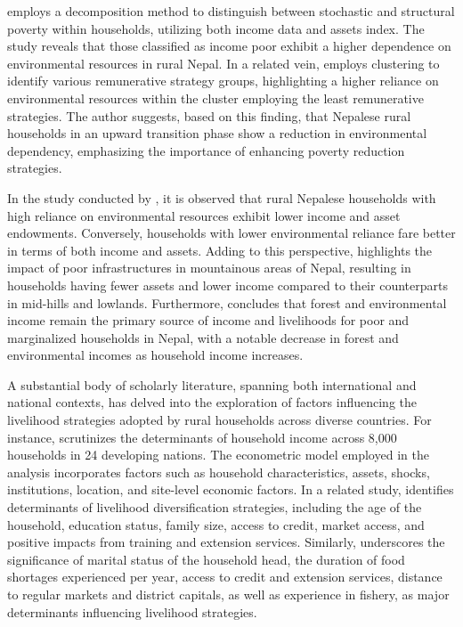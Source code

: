 \documentclass[12pt, a4paper]{article}
\begin{document}
\cite{charlery2015assessing} employs a decomposition method to distinguish between stochastic and structural poverty within households, utilizing both income data and assets index. The study reveals that those classified as income poor exhibit a higher dependence on environmental resources in rural Nepal. In a related vein, \cite{walelign2017dynamics} employs clustering to identify various remunerative strategy groups, highlighting a higher reliance on environmental resources within the cluster employing the least remunerative strategies. The author suggests, based on this finding, that Nepalese rural households in an upward transition phase show a reduction in environmental dependency, emphasizing the importance of enhancing poverty reduction strategies. 

In the study conducted by \cite{walelign2020environmental}, it is observed that rural Nepalese households with high reliance on environmental resources exhibit lower income and asset endowments. Conversely, households with lower environmental reliance fare better in terms of both income and assets. Adding to this perspective, \cite{walelign2021poverty} highlights the impact of poor infrastructures in mountainous areas of Nepal, resulting in households having fewer assets and lower income compared to their counterparts in mid-hills and lowlands. Furthermore, \cite{chhetri2022importance} concludes that forest and environmental income remain the primary source of income and livelihoods for poor and marginalized households in Nepal, with a notable decrease in forest and environmental incomes as household income increases.

A substantial body of scholarly literature, spanning both international and national contexts, has delved into the exploration of factors influencing the livelihood strategies adopted by rural households across diverse countries. For instance, \cite{angelsen2014environmental} scrutinizes the determinants of household income across 8,000 households in 24 developing nations. The econometric model employed in the analysis incorporates factors such as household characteristics, assets, shocks, institutions, location, and site-level economic factors. In a related study, \cite{emeru2022determinants} identifies determinants of livelihood diversification strategies, including the age of the household, education status, family size, access to credit, market access, and positive impacts from training and extension services. Similarly, \cite{amevenku2019determinants} underscores the significance of marital status of the household head, the duration of food shortages experienced per year, access to credit and extension services, distance to regular markets and district capitals, as well as experience in fishery, as major determinants influencing livelihood strategies.
\end{document}
